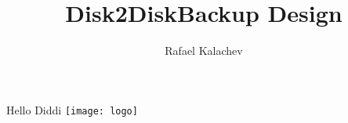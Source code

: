 \documentclass[12pt]{article}
\title{Disk2DiskBackup Design}
\author{Rafael Kalachev}
\begin{document}
Hello Diddi
\texttt{[image: logo]}
\end{document}
